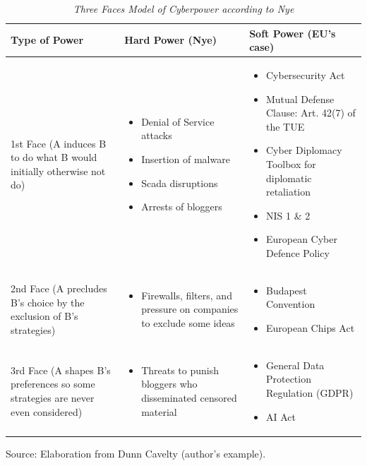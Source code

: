\begin{table}[htbp]
  \centering
  \caption{\emph{Three Faces Model of Cyberpower according to Nye \textcite{nye_2010_cyber}}}
  \begin{tabular}{p{4cm}p{4.5cm}p{5.5cm}}
    \toprule
    \textbf{Type of Power} & 
    \textbf{Hard Power} 
            (Nye) & 
    \textbf{Soft Power} 
            (EU's case) \\
    \midrule
    1st Face (A induces B to do what B would initially otherwise not do) & 
    \begin{itemize}
      \item Denial of Service attacks
      \item Insertion of malware
      \item Scada disruptions
      \item Arrests of bloggers
    \end{itemize} &
    \begin{itemize}
      \item Cybersecurity Act
      \item Mutual Defense Clause: Art. 42(7) of the TUE
      \item Cyber Diplomacy Toolbox for diplomatic retaliation
      \item NIS 1 \& 2
      \item European Cyber Defence Policy
    \end{itemize} \\
    \midrule
    2nd Face (A precludes B’s choice by the exclusion of B’s strategies) &
    \begin{itemize}
      \item Firewalls, filters, and pressure on companies to exclude some ideas
    \end{itemize} &
    \begin{itemize}
      \item Budapest Convention
      \item European Chips Act
    \end{itemize} \\
    \midrule
    3rd Face (A shapes B’s preferences so some strategies are never even considered) &
    \begin{itemize}
      \item Threats to punish bloggers who disseminated censored material
    \end{itemize} &
    \begin{itemize}
      \item General Data Protection Regulation (GDPR)
      \item AI Act
    \end{itemize} \\
    \bottomrule
  \end{tabular}
  
\raggedright
    \bigskip
    Source: Elaboration from Dunn Cavelty \textcite[11]{dunncavelty_2018_europes} (author’s example).
\end{table}



